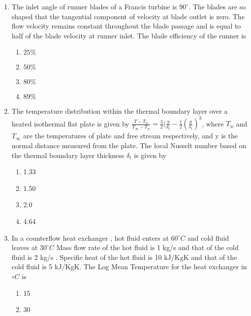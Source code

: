 \documentclass[journal]{IEEEtran}
\begin{document}
\begin{enumerate}
    

    \item The inlet angle of runner blades of a Francis turbine is $90^{\circ}$. The blades are so shaped that the tangential component of velocity at blade outlet is zero. The flow velocity remains constant throughout the blade passage and is equal to half of the blade velocity at runner inlet. The blade efficiency of the runner is
    \begin{multicols}{4}
            \begin{enumerate}
            \item $25 \%$
            \item $50 \%$
            \item $80 \%$
            \item $89 \%$
            \end{enumerate}
        \end{multicols}
    \item  The temperature distribution within the thermal boundary layer over a heated isothermal flat plate is given by
    $\frac{T-T_w}{T_\infty-T_w}=\frac{3}{2}(\frac{y}{\delta_t}-\frac{1}{2}(\frac{y}{\delta_t})^3$, where $T_w$ and $T_\infty$ are the temperatures of plate and free stream respectively, and y is the normal distance measured from the plate. The local Nusselt number based on the thermal boundary layer thickness $\delta_{t}$ is given by
    \begin{multicols}{4}
            \begin{enumerate}
              \item 1.33
              \item 1.50
              \item 2.0
              \item 4.64
            \end{enumerate}
        \end{multicols}
    \item In a counterflow heat exchanger , hot fluid enters at $60^{\circ} C$ and cold fluid leaves at $30^{\circ} C$ Mass flow rate of the hot fluid is 1 kg/s and that of the cold fluid is 2 kg/s . Specific heat of the hot fluid is 10 kJ/KgK and that of the cold  fluid is 5 kJ/KgK. The Log Mean Temperature for the heat exchanger in ${\circ} C$ is 
    \begin{multicols}{4}
            \begin{enumerate}
              \item 15
              \item 30

\end{enumerate}
\end{multicols}
\end{enumerate}
\end{document}
